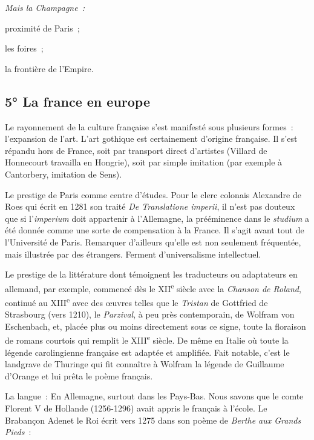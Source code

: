 \documentclass[french,twoside]{book} %
\newlength{\listmod}
\newcommand{\listhead}[1]{\hspace{-1\listmod}\emph{#1}}
\def\mednobreak{\ifdim\lastskip<\medskipamount
  \removelastskip\nopagebreak\medskip\fi}
\newcommand{\labelblock}[1]{\medbreak{\noindent\color{rubric}\bfseries #1}\par\mednobreak}
\begin{document}
\begin{listalpha}[itemsep=0pt,]
\item[]\listhead{Mais la Champagne :}
\item proximité de Paris ;
\item les foires ;
\item la frontière de l’Empire.
\end{listalpha}

\subsection[{5° La france en europe}]{5° La france en europe}
\label{c03c5}

\labelblock{— Aspect culturel.}

\noindent Le rayonnement de la culture française s’est manifesté sous plusieurs formes : l’expansion de l’art. L’art gothique est certainement d’origine française. Il s’est répandu hors de France, soit par transport direct d’artistes (Villard de Honnecourt travailla en Hongrie), soit par simple imitation (par exemple à Cantorbery, imitation de Sens).\par
Le prestige de Paris comme centre d’études. Pour le clerc colonais Alexandre de Roes qui écrit en 1281 son traité {\itshape De Translatione imperii}, il n’est pas douteux que si l’{\itshape imperium} doit appartenir à l’Allemagne, la prééminence dans le {\itshape studium} a été donnée comme une sorte de compensation à la France. Il s’agit avant tout de l’Université de Paris. Remarquer d’ailleurs qu’elle est non seulement fréquentée, mais illustrée par des étrangers. Ferment d’universalisme intellectuel.\par
Le prestige de la littérature dont témoignent les traducteurs ou adaptateurs en allemand, par exemple, commencé dès le XII\textsuperscript{e} siècle avec la {\itshape Chanson de Roland}, continué au XIII\textsuperscript{e} avec des œuvres telles que le {\itshape Tristan} de Gottfried de Strasbourg (vers 1210), le {\itshape Parzival}, à peu près contemporain, de Wolfram von Eschenbach, et, placée plus ou moins directement sous ce signe, toute la floraison de romans courtois qui remplit le XIII\textsuperscript{e} siècle. De même en Italie où toute la légende carolingienne française est adaptée et amplifiée. Fait notable, c’est le landgrave de Thuringe qui fit connaître à Wolfram la légende de Guillaume d’Orange et lui prêta le poème français.\par
La langue : En Allemagne, surtout dans les Pays-Bas. Nous savons que le comte Florent V de Hollande (1256-1296) avait appris le français à l’école. Le Brabançon Adenet le Roi écrit vers 1275 dans son poème de {\itshape Berthe aux Grands Pieds} :\par
\end{document}
